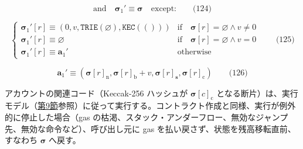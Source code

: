 \documentclass[
]{ltjsarticle}
\begin{document}
\[\text{and}\quad \boldsymbol{\sigma}_1' \equiv \boldsymbol{\sigma} \quad \text{except:} \qquad \text{(124)}\]

\protect\hypertarget{eq-125}{}{}

\[\begin{cases}
\boldsymbol{\sigma}_1'[r] \equiv (0, v, \mathtt{TRIE}(\varnothing), \mathtt{KEC}(())) & \text{if} \quad \boldsymbol{\sigma}[r] = \varnothing \wedge v \neq 0 \\
\boldsymbol{\sigma}_1'[r] \equiv \varnothing & \text{if}\quad \boldsymbol{\sigma}[r] = \varnothing \wedge v = 0 \\
\boldsymbol{\sigma}_1'[r] \equiv \mathbf{a}_1' & \text{otherwise}
\end{cases} \qquad \text{(125)}\]

\protect\hypertarget{eq-126}{}{}

\[\mathbf{a}_1' \equiv (\boldsymbol{\sigma}[r]_{\mathrm{n}}, \boldsymbol{\sigma}[r]_{\mathrm{b}} + v, \boldsymbol{\sigma}[r]_{\mathbf{s}}, \boldsymbol{\sigma}[r]_{\mathrm{c}}) \qquad \text{(126)}\]

アカウントの関連コード（Keccak-256 ハッシュが
\(\boldsymbol{\sigma}[c]_{\mathrm{c}}\)
となる断片）は、実行モデル（\protect\hyperlink{ch:model}{第9節}参照）に従って実行する。コントラクト作成と同様、実行が例外的に停止した場合（gas
の枯渇、スタック・アンダーフロー、無効なジャンプ先、無効な命令など）、呼び出し元に
gas を払い戻さず、状態を残高移転直前、すなわち \(\boldsymbol{\sigma}\)
へ戻す。

\protect\hypertarget{eq-127}{}{}\protect\hypertarget{eq-128}{}{}\protect\hypertarget{eq-129}{}{}\protect\hypertarget{eq-130}{}{}\protect\hypertarget{eq-131}{}{}\protect\hypertarget{eq-132}{}{}\protect\hypertarget{eq-133}{}{}\protect\hypertarget{eq-134}{}{}\protect\hypertarget{eq-135}{}{}\protect\hypertarget{eq-136}{}{}\protect\hypertarget{eq-137}{}{}\protect\hypertarget{eq-138}{}{}\protect\hypertarget{eq-139}{}{}\protect\hypertarget{code_execution_result}{}{}
\end{document}
